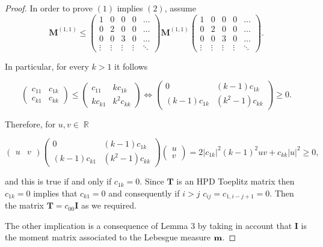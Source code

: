 \documentclass[12pt]{amsart}
\theoremstyle{definition}
\theoremstyle{plain}
\theoremstyle{remark}
\DeclareMathOperator{\RR}{\mathbb R}
\begin{document}
\begin{proof}  In order to prove $(1)$ implies $(2)$, assume   
$$
\mathbf{M}^{(1,1)} \leq \begin{pmatrix}  1 & 0& 0 & 0 & \dots \\  0 & 2& 0 & 0 & \dots \\  0 & 0 & 3 & 0 & \dots \\  \vdots  & \vdots & \vdots & \vdots & \ddots \end{pmatrix} \mathbf{M}^{(1,1)}
\begin{pmatrix}  1 & 0& 0 & 0 & \dots \\  0 & 2& 0 & 0 & \dots \\  0 & 0 & 3 & 0 & \dots \\  \vdots  & \vdots & \vdots & \vdots & \ddots \end{pmatrix}.
$$




\noindent In particular, for every $k >1$ it follows 

$$
\begin{pmatrix} c_{11} & c_{1k} \\ c_{k1} & c_{kk} \end{pmatrix} \leq \begin{pmatrix} c_{11} & kc_{1k} \\ kc_{k1} & k^2c_{kk} \end{pmatrix} \Leftrightarrow
\begin{pmatrix} 0 & (k-1)c_{1k} \\ (k-1)c_{1k} & (k^2-1)c_{kk} \end{pmatrix}
\geq 0.$$

\noindent Therefore, for $u,v\in \RR$ 

$$
\begin{pmatrix} u & v \end{pmatrix} 
\begin{pmatrix} 0 & (k-1)c_{1k} \\ (k-1)c_{k1} & (k^2-1)c_{kk} \end{pmatrix} \begin{pmatrix} u \\ v \end{pmatrix} = 2 \vert c_{1k}\vert^{2}(k-1)^2uv+ c_{kk} \vert u \vert^{2} \geq 0 ,
$$


\noindent and this is true if and only if $c_{1k}=0$. Since $\mathbf{T}$  is an HPD Toeplitz matrix then $c_{1k}=0$ implies that $c_{k1}=0$ 
and consequently if $i>  j$ $c_{ij}=c_{1,i-j+1}=0$. Then the matrix $\mathbf{T}=c_{00}\mathbf{I}$ as we required. 

\noindent  The other implication is a consequence of Lemma $3$ by taking in account that $\mathbf{I}$ is the moment matrix associated to  the Lebesgue measure ${\bf m}$. 
\end{proof} 
\end{document}
